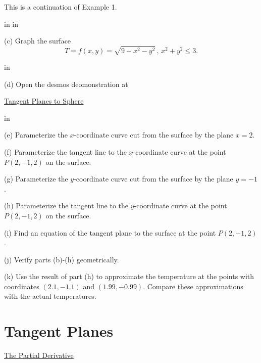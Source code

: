 \documentclass{ximera}
\newcommand{\pskip}{\vskip 0.1 in}
\begin{document}
\begin{example}  \label{Esdtr435r}
This is a continuation of Example 1. 

\pskip \pskip

(c) Graph the surface
\[
  T = f(x,y) = \sqrt{9-x^2-y^2} \, , \, x^2 + y^2 \leq 3 .
\]

\pskip

(d) Open the desmos deomonstration at

\href{https://www.desmos.com/3d/d78d5a3138}{Tangent Planes to Sphere}

\pskip

(e) Parameterize the $x$-coordinate curve cut from the surface by the plane $x=2$.

(f) Parameterize the tangent line to the $x$-coordinate curve at the point $P(2,-1,2)$ on the surface.

(g) Parameterize the $y$-coordinate curve cut from the surface by the plane $y=-1$.

(h) Parameterize the tangent line to the $y$-coordinate curve at the point $P(2,-1,2)$ on the surface.

(i) Find an equation of the tangent plane to the surface at the point $P(2,-1,2)$.

(j) Verify parts (b)-(h) geometrically.

(k) Use the result of part (h) to approximate the temperature at the points with coordinates $(2.1, -1.1)$ and $(1.99, -0.99)$. Compare these approximations with the actual temperatures.

\end{example}



\section{Tangent Planes}
\begin{exploration}  \label{Edf754665}

 
\begin{onlineOnly}
    \begin{center}
\end{center}
\end{onlineOnly}


\href{https://www.desmos.com/calculator/y0h5kuvmbt}{The Partial Derivative}

\end{exploration}
\end{document}
